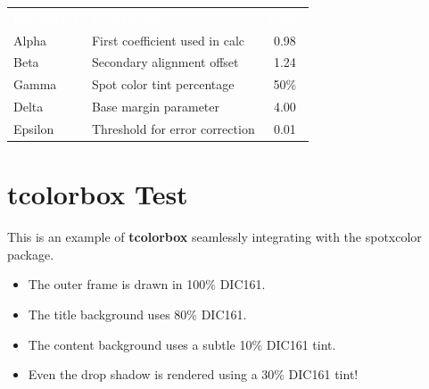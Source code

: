\documentclass{article}\listfiles\pagestyle{empty}
\newcommand\onelineskip{\par\vspace{\baselineskip}\par}
\begin{document}
\begin{center}
  \renewcommand{\arraystretch}{1.5}
  \begin{tabular}{p{3cm} p{5cm} c}
    \rowcolor{DIC161s}
    \textcolor{white}{\textbf{Parameter}} & \textcolor{white}{\textbf{Description}} & \textcolor{white}{\textbf{Value}} \\
    Alpha   & First coefficient used in calc & 0.98 \\
    Beta    & Secondary alignment offset     & 1.24 \\
    Gamma   & Spot color tint percentage     & 50\% \\
    Delta   & Base margin parameter          & 4.00 \\
    Epsilon & Threshold for error correction & 0.01 \\
  \end{tabular}
\end{center}

\onelineskip

\section{tcolorbox Test}

\begin{tcolorbox}[
  enhanced, %
  colframe=DIC161s,       %
  colback=DIC161s!5,      %
  coltitle=white,        %
  colbacktitle=DIC161s!80,%
  fonttitle=\sffamily\bfseries\Large,
  title={spotxcolor $\times$ tcolorbox},
  drop fuzzy shadow=DIC161s!30 %
]
This is an example of \textbf{tcolorbox} seamlessly integrating with the \textsf{spotxcolor} package.

\onelineskip

\begin{itemize}
  \item The outer frame is drawn in \textcolor{DIC161s}{100\% DIC161}.
  \item The title background uses \textcolor{DIC161s!80}{80\% DIC161}.
  \item The content background uses a subtle \textcolor{DIC161s!10}{10\% DIC161} tint.
  \item Even the drop shadow is rendered using a \textcolor{DIC161s!30}{30\% DIC161} tint!
\end{itemize}
\end{tcolorbox}
\end{document}
